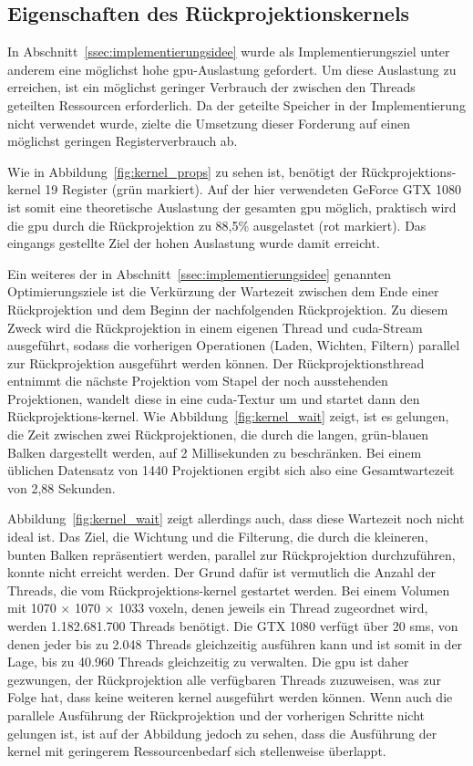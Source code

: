 \subsection{Eigenschaften des Rückprojektionskernels}

In Abschnitt~\ref{ssec:implementierungsidee} wurde als Implementierungsziel unter anderem eine möglichst hohe
\gls{gpu}-Auslastung gefordert. Um diese Auslastung zu erreichen, ist ein möglichst geringer Verbrauch der zwischen den
Threads geteilten Ressourcen erforderlich. Da der geteilte Speicher in der Implementierung nicht verwendet wurde, zielte
die Umsetzung dieser Forderung auf einen möglichst geringen Registerverbrauch ab.

Wie in Abbildung~\ref{fig:kernel_props} zu sehen ist, benötigt der Rückprojektions-\gls{kernel} 19 Register
(grün markiert). Auf der hier verwendeten GeForce GTX 1080 ist somit eine theoretische Auslastung der gesamten \gls{gpu}
möglich, praktisch wird die \gls{gpu} durch die Rückprojektion zu 88,5\% ausgelastet (rot markiert). Das eingangs
gestellte Ziel der hohen Auslastung wurde damit erreicht.

Ein weiteres der in Abschnitt~\ref{ssec:implementierungsidee} genannten Optimierungsziele ist die Verkürzung der
Wartezeit zwischen dem Ende einer Rückprojektion und dem Beginn der nachfolgenden Rückprojektion. Zu diesem Zweck wird
die Rückprojektion in einem eigenen Thread und \gls{cuda}-Stream ausgeführt, sodass die vorherigen Operationen (Laden,
Wichten, Filtern) parallel zur Rückprojektion ausgeführt werden können. Der Rückprojektionsthread entnimmt die nächste
Projektion vom Stapel der noch ausstehenden Projektionen, wandelt diese in eine \gls{cuda}-Textur um und startet dann
den Rückprojektions-\gls{kernel}. Wie Abbildung~\ref{fig:kernel_wait} zeigt, ist es gelungen, die Zeit zwischen zwei
Rückprojektionen, die durch die langen, grün-blauen Balken dargestellt werden, auf 2 Millisekunden zu beschränken. Bei
einem üblichen Datensatz von 1440 Projektionen ergibt sich also eine Gesamtwartezeit von 2,88 Sekunden.

Abbildung~\ref{fig:kernel_wait} zeigt allerdings auch, dass diese Wartezeit noch nicht ideal ist. Das Ziel, die Wichtung
und die Filterung, die durch die kleineren, bunten Balken repräsentiert werden, parallel zur Rückprojektion
durchzuführen, konnte nicht erreicht werden. Der Grund dafür ist vermutlich die Anzahl der Threads, die vom
Rückprojektions-\gls{kernel} gestartet werden. Bei einem Volumen mit 1070 $\times$ 1070 $\times$ 1033 \gls{voxel}n,
denen jeweils ein Thread zugeordnet wird, werden 1.182.681.700 Threads benötigt. Die GTX 1080 verfügt über 20 \gls{sm}s,
von denen jeder bis zu 2.048 Threads gleichzeitig ausführen kann und ist somit in der Lage, bis zu 40.960 Threads
gleichzeitig zu verwalten. Die \gls{gpu} ist daher gezwungen, der Rückprojektion alle verfügbaren Threads zuzuweisen,
was zur Folge hat, dass keine weiteren \gls{kernel} ausgeführt werden können. Wenn auch die parallele Ausführung der
Rückprojektion und der vorherigen Schritte nicht gelungen ist, ist auf der Abbildung jedoch zu sehen, dass die
Ausführung der \gls{kernel} mit geringerem Ressourcenbedarf sich stellenweise überlappt.

